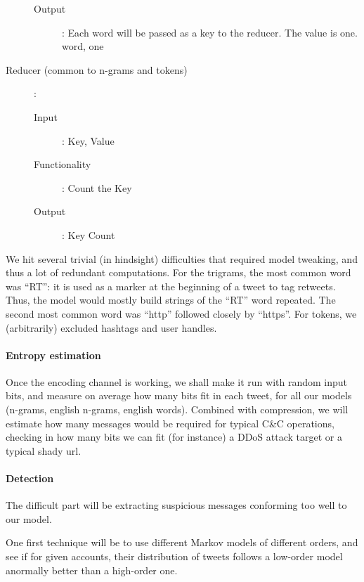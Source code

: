 \documentclass[a4paper,11pt]{article}
\begin{document}
\begin{flushleft}
\begin{description}
\begin{description}
\item[Output]: Each word will be passed as a key to the reducer. The value is one. 
		{word, one}
			
\end{description}
	
\item[Reducer (common to n-grams and tokens)]:

\begin{description}
\item[Input]: {Key, Value}

\item[Functionality]: Count the Key

\item[Output]: Key Count
\end{description}

\end{description}
 
\end{flushleft}

We hit several trivial (in hindsight) difficulties that required model tweaking, and thus a lot of redundant computations. For the trigrams, the most common word was ``RT'': it is used as a marker at the beginning of a tweet to tag retweets. Thus, the model would mostly build strings of the ``RT'' word repeated. The second most common word was ``http'' followed closely by ``https''. For tokens, we (arbitrarily) excluded hashtags and user handles.

\paragraph{Entropy estimation}

Once the encoding channel is working, we shall make it run with random input bits, and measure on average how many bits fit in each tweet, for all our models (n-grams, english n-grams, english words). Combined with compression, we will estimate how many messages would be required for typical C\&C operations, checking in how many bits we can fit (for instance) a DDoS attack target or a typical shady url.

\paragraph{Detection}

The difficult part will be extracting suspicious messages conforming too well to our model. 

One first technique will be to use different Markov models of different orders, and see if for given accounts, their distribution of tweets follows a low-order model anormally better than a high-order one.
\end{document}
